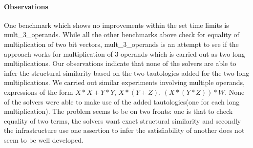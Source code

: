 \paragraph{\bf Observations}
%
One benchmark which shows no improvements within the set time limits is mult\_3\_operands. While all the other benchmarks above check for equality of multiplication of two bit vectors, mult\_3\_operands is an attempt to see if the approach works for multiplication of 3 operands which is carried out as two long multiplications. Our observations indicate that none of the solvers are able to infer the structural similarity based on the two tautologies added for the two long multiplications. We carried out similar experiments involving multiple operands, expressions of the form $X*X + Y*Y$, $X*(Y+Z)$, $(X*(Y*Z))*W$. None of the solvers were able to make use of the added tautologies(one for each long multiplication). The problem seems to be on two fronts: one is that to check equality of two terms, the solvers want exact structural similarity and secondly the infrastructure use one assertion to infer the satisfiability of another does not seem to be well developed. 






